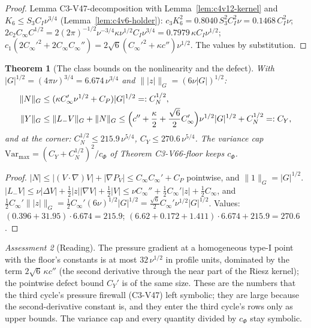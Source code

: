 \documentclass[11pt]{article}
\theoremstyle{plain}
\newtheorem{theorem}{Theorem}[section]
\theoremstyle{definition}
\theoremstyle{remark}
\newtheorem{assessment}[theorem]{Assessment}
\begin{document}
\begin{proof}
Lemma C3-V47-decomposition with Lemma~\ref{lem:c4v12-kernel} and
\(K_6\le S_3C_I\nu^{3/4}\) (Lemma~\ref{lem:c4v6-holder}): \(c_3K_6^2=0.8040\,S_3^2C_I^2\nu=0.1468\,C_I^2\nu\);
\(2c_2C_\infty C^{1/2}=2(2\pi)^{-1/2}\nu^{-3/4}\kappa\nu^{1/2}C_I\nu^{3/4}=0.7979\,\kappa C_I\nu^{1/2}\); \(c_1(2C_\infty'^2+2C_\infty C_\infty'')=2\sqrt6(C_\infty'^2+\kappa c'')\nu^{1/2}\).
The values by substitution.
\end{proof}

\begin{theorem}[The class bounds on the nonlinearity and the defect]
\label{thm:c4v12-YN}
With \(|G|^{1/2}=(4\pi\nu)^{3/4}=6.674\,\nu^{3/4}\) and \(\||z|\|_G=(6\nu|G|)^{1/2}\):
\begin{align}
 \|N\|_G&\le(\kappa C_\infty'\nu^{1/2}+C_P)|G|^{1/2}=:C_N^{1/2},\\
 \|Y\|_G&\le\|L_-V\|_G+\|N\|_G\le\Bigl(c''+\frac\kappa2+\frac{\sqrt6}2C_\infty'\Bigr)\nu^{1/2}|G|^{1/2}+C_N^{1/2}=:C_Y ,
 \label{eq:c4v12-YN}
\end{align}
and at the corner: \(C_N^{1/2}\le215.9\,\nu^{5/4}\), \(C_Y\le270.6\,\nu^{5/4}\).  The variance cap
\(\mathrm{Var}_{\max}=(C_Y+C_N^{1/2})^2/c_\Phi\) of Theorem C3-V66-floor keeps \(c_\Phi\).
\end{theorem}

\begin{proof}
\(|N|\le|(V\cdot\nabla)V|+|\nabla P_V|\le C_\infty C_\infty'+C_P\) pointwise, and \(\|1\|_G=|G|^{1/2}\).
\(|L_-V|\le\nu|\Delta V|+\frac12|z||\nabla V|+\frac12|V|\le\nu C_\infty''+\frac12C_\infty'|z|+\frac12C_\infty\), and
\(\frac12C_\infty'\||z|\|_G=\frac12C_\infty'(6\nu)^{1/2}|G|^{1/2}=\frac{\sqrt6}2C_\infty'\nu^{1/2}|G|^{1/2}\).  Values:
\((0.396+31.95)\cdot6.674=215.9\); \((6.62+0.172+1.411)\cdot6.674+215.9=270.6\).
\end{proof}

\begin{assessment}[Reading]
\label{ass:c4v12-reading}
The pressure gradient at a homogeneous type-I point with the
floor's constants is at most \(32\,\nu^{1/2}\) in profile units, dominated by
the term \(2\sqrt6\,\kappa c''\) (the second derivative through the near part of
the Riesz kernel); the pointwise defect bound \(C_Y'\) is of the same
size.  These are the numbers that the third cycle's pressure firewall
(C3-V47) left symbolic; they are large because the second-derivative
constant is, and they enter the third cycle's rows only as upper
bounds.  The variance cap and every quantity divided by \(c_\Phi\) stay
symbolic.
\end{assessment}
\end{document}
